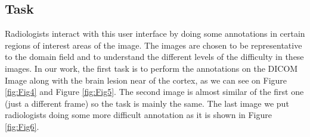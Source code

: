 \documentclass{chi-ext}
\begin{document}
\subsection{Task}

Radiologists interact with this user interface by doing some annotations in certain regions of interest areas of the image. The images are chosen to be representative to the domain field and to understand the different levels of the difficulty in these images. In our work, the first task is to perform the annotations on the DICOM Image along with the brain lesion near of the cortex, as we can see on Figure \ref{fig:Fig4} and Figure \ref{fig:Fig5}. The second image is almost similar of the first one (just a different frame) so the task is mainly the same. The last image we put radiologists doing some more difficult annotation as it is shown in Figure \ref{fig:Fig6}.

\end{document}
